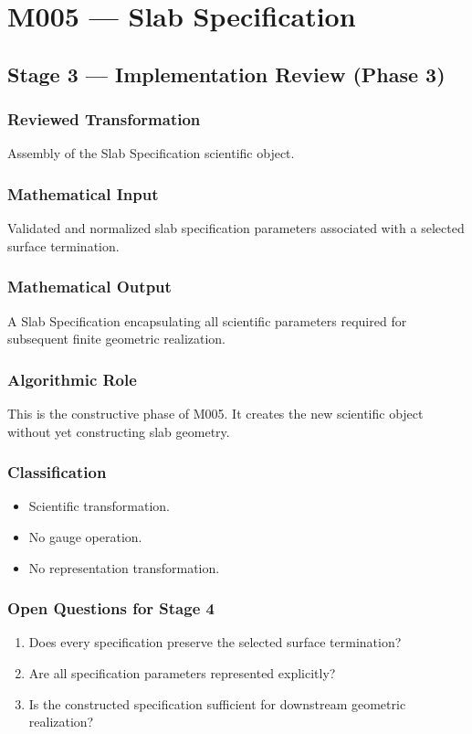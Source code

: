 \chapter{M005 --- Slab Specification}

\section{Stage 3 --- Implementation Review (Phase 3)}

\subsection{Reviewed Transformation}

Assembly of the Slab Specification scientific object.

\subsection{Mathematical Input}

Validated and normalized slab specification parameters associated with a
selected surface termination.

\subsection{Mathematical Output}

A Slab Specification encapsulating all scientific parameters required
for subsequent finite geometric realization.

\subsection{Algorithmic Role}

This is the constructive phase of M005. It creates the new scientific
object without yet constructing slab geometry.

\subsection{Classification}

\begin{itemize}
\item Scientific transformation.
\item No gauge operation.
\item No representation transformation.
\end{itemize}

\subsection{Open Questions for Stage 4}

\begin{enumerate}
\item Does every specification preserve the selected surface termination?
\item Are all specification parameters represented explicitly?
\item Is the constructed specification sufficient for downstream geometric realization?
\end{enumerate}
